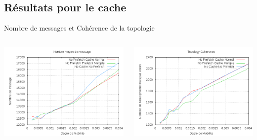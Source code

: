 \documentclass{beamer}
\begin{document}
  \subsection{Résultats pour le cache}
  \begin{frame}
	\begin{center}
	Nombre de messages et Cohérence de la topologie
	\end{center}
	\begin{columns}
         \begin{column}{5cm}
          \includegraphics[scale=0.25]{./Ressources/Images/Courbes_Final_Rapport/Nombre_Messages_Caches.png}\\
         \end{column}
         \begin{column}{5cm}
          \includegraphics[scale=0.25]{./Ressources/Images/Courbes_Final_Rapport/Topology_Coherence_Caches.png}\\
         \end{column}
        \end{columns}


  \end{frame}
\end{document}
